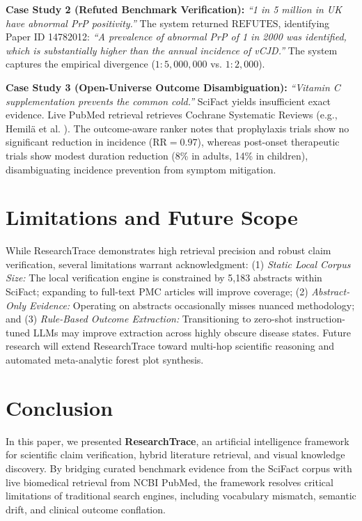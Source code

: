 \documentclass[conference]{IEEEtran}
\begin{document}
\textbf{Case Study 2 (Refuted Benchmark Verification):} \textit{``1 in 5 million in UK have abnormal PrP positivity.''} The system returned $\text{REFUTES}$, identifying Paper ID 14782012: \textit{``A prevalence of abnormal PrP of 1 in 2000 was identified, which is substantially higher than the annual incidence of vCJD.''} The system captures the empirical divergence ($1:5,000,000$ vs. $1:2,000$).

\textbf{Case Study 3 (Open-Universe Outcome Disambiguation):} \textit{``Vitamin C supplementation prevents the common cold.''} SciFact yields insufficient exact evidence. Live PubMed retrieval retrieves Cochrane Systematic Reviews (e.g., Hemil{\"{a}} et al. \cite{hemila2013vitamin}). The outcome-aware ranker notes that prophylaxis trials show no significant reduction in incidence ($\text{RR} = 0.97$), whereas post-onset therapeutic trials show modest duration reduction (8\% in adults, 14\% in children), disambiguating incidence prevention from symptom mitigation.

\section{Limitations and Future Scope}

While ResearchTrace demonstrates high retrieval precision and robust claim verification, several limitations warrant acknowledgment: (1) \textit{Static Local Corpus Size:} The local verification engine is constrained by 5,183 abstracts within SciFact; expanding to full-text PMC articles will improve coverage; (2) \textit{Abstract-Only Evidence:} Operating on abstracts occasionally misses nuanced methodology; and (3) \textit{Rule-Based Outcome Extraction:} Transitioning to zero-shot instruction-tuned LLMs may improve extraction across highly obscure disease states. Future research will extend ResearchTrace toward multi-hop scientific reasoning and automated meta-analytic forest plot synthesis.

\section{Conclusion}

In this paper, we presented \textbf{ResearchTrace}, an artificial intelligence framework for scientific claim verification, hybrid literature retrieval, and visual knowledge discovery. By bridging curated benchmark evidence from the SciFact corpus with live biomedical retrieval from NCBI PubMed, the framework resolves critical limitations of traditional search engines, including vocabulary mismatch, semantic drift, and clinical outcome conflation.
\end{document}
